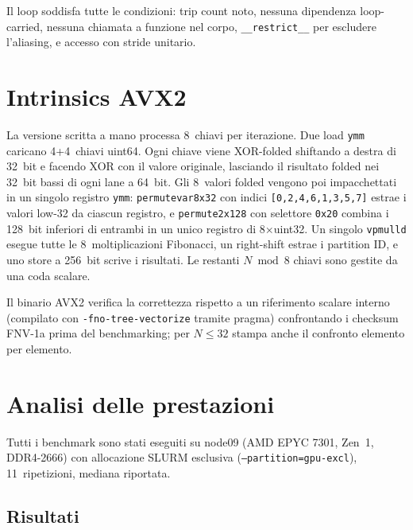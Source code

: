 \documentclass[10pt,a4paper,twocolumn]{article}
\begin{document}
Il loop soddisfa tutte le condizioni: trip count noto, nessuna dipendenza loop-carried, nessuna chiamata a funzione nel corpo, \texttt{\_\_restrict\_\_} per escludere l'aliasing, e accesso con stride unitario.

\section{Intrinsics AVX2}

La versione scritta a mano processa 8~chiavi per iterazione. Due load \texttt{ymm} caricano 4+4~chiavi uint64. Ogni chiave viene XOR-folded shiftando a destra di 32~bit e facendo XOR con il valore originale, lasciando il risultato folded nei 32~bit bassi di ogni lane a 64~bit. Gli 8~valori folded vengono poi impacchettati in un singolo registro \texttt{ymm}: \texttt{permutevar8x32} con indici \texttt{[0,2,4,6,1,3,5,7]} estrae i valori low-32 da ciascun registro, e \texttt{permute2x128} con selettore \texttt{0x20} combina i 128~bit inferiori di entrambi in un unico registro di 8$\times$uint32. Un singolo \texttt{vpmulld} esegue tutte le 8~moltiplicazioni Fibonacci, un right-shift estrae i partition ID, e uno store a 256~bit scrive i risultati. Le restanti $N \bmod 8$ chiavi sono gestite da una coda scalare.

Il binario AVX2 verifica la correttezza rispetto a un riferimento scalare interno (compilato con \texttt{-fno-tree-vectorize} tramite pragma) confrontando i checksum FNV-1a prima del benchmarking; per $N\!\leq\!32$ stampa anche il confronto elemento per elemento.

\section{Analisi delle prestazioni}
\label{sec:analysis}

Tutti i benchmark sono stati eseguiti su node09 (AMD EPYC 7301, Zen~1, DDR4-2666) con allocazione SLURM esclusiva (\texttt{--partition=gpu-excl}), 11~ripetizioni, mediana riportata.

\subsection{Risultati}
\end{document}
